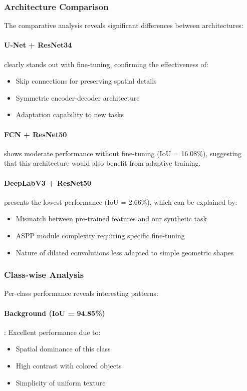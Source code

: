 \documentclass[12pt,a4paper]{article}
\begin{document}
\subsubsection{Architecture Comparison}

The comparative analysis reveals significant differences between architectures:

\paragraph{U-Net + ResNet34} clearly stands out with fine-tuning, confirming the effectiveness of:
\begin{itemize}
    \item Skip connections for preserving spatial details
    \item Symmetric encoder-decoder architecture
    \item Adaptation capability to new tasks
\end{itemize}

\paragraph{FCN + ResNet50} shows moderate performance without fine-tuning (IoU = 16.08\%), suggesting that this architecture would also benefit from adaptive training.

\paragraph{DeepLabV3 + ResNet50} presents the lowest performance (IoU = 2.66\%), which can be explained by:
\begin{itemize}
    \item Mismatch between pre-trained features and our synthetic task
    \item ASPP module complexity requiring specific fine-tuning
    \item Nature of dilated convolutions less adapted to simple geometric shapes
\end{itemize}

\subsubsection{Class-wise Analysis}

Per-class performance reveals interesting patterns:

\paragraph{Background (IoU = 94.85\%)}: Excellent performance due to:
\begin{itemize}
    \item Spatial dominance of this class
    \item High contrast with colored objects
    \item Simplicity of uniform texture
\end{itemize}
\end{document}

